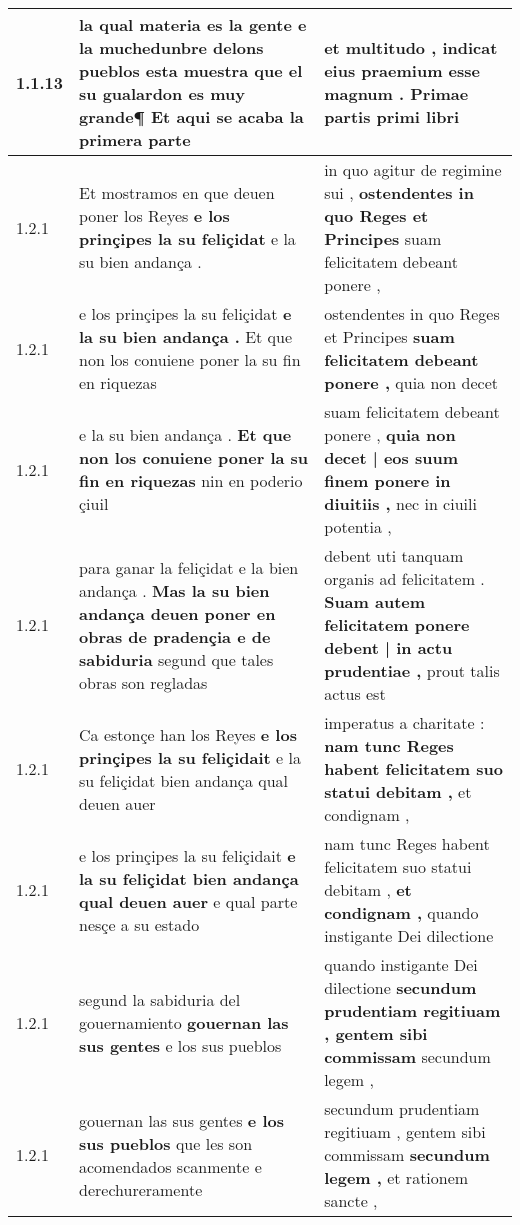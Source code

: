 \begin{tabular}{|p{1cm}|p{6.5cm}|p{6.5cm}|}
1.1.13 & la qual materia es la gente e la muchedunbre delons pueblos esta muestra \textbf{ que el su gualardon es muy grande¶ } Et aqui se acaba la primera parte & et multitudo , \textbf{ indicat eius praemium esse magnum . } Primae partis primi libri \\\hline
1.2.1 & Et mostramos en que deuen poner los Reyes \textbf{ e los prinçipes la su feliçidat } e la su bien andança . & in quo agitur de regimine sui , \textbf{ ostendentes in quo Reges et Principes } suam felicitatem debeant ponere , \\\hline
1.2.1 & e los prinçipes la su feliçidat \textbf{ e la su bien andança . } Et que non los conuiene poner la su fin en riquezas & ostendentes in quo Reges et Principes \textbf{ suam felicitatem debeant ponere , } quia non decet \\\hline
1.2.1 & e la su bien andança . \textbf{ Et que non los conuiene poner la su fin en riquezas } nin en poderio çiuil & suam felicitatem debeant ponere , \textbf{ quia non decet | eos suum finem ponere in diuitiis , } nec in ciuili potentia , \\\hline
1.2.1 & para ganar la feliçidat e la bien andança . \textbf{ Mas la su bien andança deuen poner en obras de pradençia e de sabiduria } segund que tales obras son regladas & debent uti tanquam organis ad felicitatem . \textbf{ Suam autem felicitatem ponere debent | in actu prudentiae , } prout talis actus est \\\hline
1.2.1 & Ca estonçe han los Reyes \textbf{ e los prinçipes la su feliçidait } e la su feliçidat bien andança qual deuen auer & imperatus a charitate : \textbf{ nam tunc Reges habent felicitatem suo statui debitam , } et condignam , \\\hline
1.2.1 & e los prinçipes la su feliçidait \textbf{ e la su feliçidat bien andança qual deuen auer } e qual parte nesçe a su estado & nam tunc Reges habent felicitatem suo statui debitam , \textbf{ et condignam , } quando instigante Dei dilectione \\\hline
1.2.1 & segund la sabiduria del gouernamiento \textbf{ gouernan las sus gentes } e los sus pueblos & quando instigante Dei dilectione \textbf{ secundum prudentiam regitiuam , gentem sibi commissam } secundum legem , \\\hline
1.2.1 & gouernan las sus gentes \textbf{ e los sus pueblos } que les son acomendados scanmente e derechureramente & secundum prudentiam regitiuam , gentem sibi commissam \textbf{ secundum legem , } et rationem sancte , \\\hline

\end{tabular}
